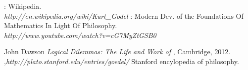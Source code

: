 
\begin{thebibliography}
%
\kg: Wikipedia. \\\textit{http://en.wikipedia.org/wiki/Kurt_Godel}
\kg: Modern Dev. of the Foundations Of Mathematics In Light Of Philosophy.\\\textit{http://www.youtube.com/watch?v=cG7MyZtGSB0}

John Dawson 
{\emph{Logical Dilemmas: The Life and Work of \kg  }},
Cambridge, 2012.
{\emph{\kg  }},\textit{http://plato.stanford.edu/entries/goedel/}
Stanford encylopedia of philosophy.

\end{thebibliography}
